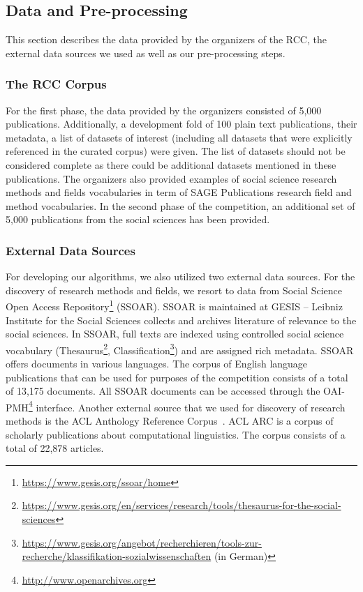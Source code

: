\subsection{Data and Pre-processing}
This section describes the data provided by the organizers of the RCC, the external data sources we used as well as our pre-processing steps.

\subsubsection{The RCC Corpus}
\label{subsec:rcc-corpus}
For the first phase, the data provided by the organizers consisted of 5,000 publications. Additionally, a development fold of 100 plain text publications, their metadata, a list of datasets of interest (including all datasets that were explicitly referenced in the curated corpus) were given. The list of datasets should not be considered complete as  there could be additional datasets mentioned in these publications. 
The organizers also provided examples of social science research methods and fields vocabularies in term of SAGE Publications research field and method vocabularies. 
In the second phase of the competition, an additional set of 5,000 publications from the social sciences has been provided.

\subsubsection{External Data Sources}
For developing our algorithms, we also utilized two external data sources. For the discovery of research methods and fields, we resort to data from Social Science Open Access Repository\footnote{\url{https://www.gesis.org/ssoar/home}} (SSOAR). 
SSOAR is maintained at GESIS – Leibniz Institute for the Social Sciences collects and archives literature of relevance to the social sciences. In SSOAR, full texts are indexed using controlled social science vocabulary (Thesaurus\footnote{\url{https://www.gesis.org/en/services/research/tools/thesaurus-for-the-social-sciences}}, Classification\footnote{\url{https://www.gesis.org/angebot/recherchieren/tools-zur-recherche/klassifikation-sozialwissenschaften} (in German)}) and are assigned rich metadata. SSOAR offers documents in various languages. The corpus of English language publications that can be used for purposes of the competition consists of a total of 13,175 documents. All SSOAR documents can be accessed through the OAI-PMH\footnote{{\url{http://www.openarchives.org}}} interface. 
Another external source that we used for discovery of research methods is the ACL Anthology Reference Corpus~\cite{bird2008acl}. ACL ARC is a corpus of scholarly publications about computational linguistics.  
The corpus consists of a total of 22,878 articles.

